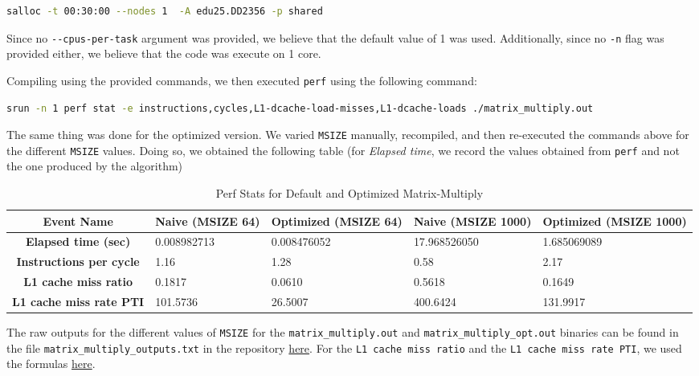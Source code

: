 \documentclass[a4paper,10pt]{article}
\begin{document}
\begin{lstlisting}[language=bash,basicstyle=\ttfamily]
salloc -t 00:30:00 --nodes 1  -A edu25.DD2356 -p shared
\end{lstlisting}
Since no \verb|--cpus-per-task| argument was provided, we believe that the default value of 1 was used. Additionally, since no \verb|-n| flag was provided either, we believe that the code was execute on 1 core. 

Compiling using the provided commands, we then executed \verb|perf| using the following command: 
\begin{lstlisting}[language=bash,basicstyle=\tiny\ttfamily]
srun -n 1 perf stat -e instructions,cycles,L1-dcache-load-misses,L1-dcache-loads ./matrix_multiply.out
\end{lstlisting}
The same thing was done for the optimized version. We varied \verb|MSIZE| manually, recompiled, and then re-executed the commands above for the different \verb|MSIZE| values. 
Doing so, we obtained the following table (for \textit{Elapsed time}, we record the values obtained from \verb|perf| and not the one produced by the algorithm) 
\begin{table}[h!]
\centering
\begin{tabular}{|c|p{2.5cm}|p{2.5cm}|p{2.5cm}|p{2.5cm}|}
\hline
\textbf{Event Name} & \textbf{Naive (MSIZE 64)} & \textbf{Optimized (MSIZE 64)} & \textbf{Naive (MSIZE 1000)} & \textbf{Optimized (MSIZE 1000)} \\
\hline
\textbf{Elapsed time (sec)} & 0.008982713 & 0.008476052 & 17.968526050 & 1.685069089 \\
\hline
\textbf{Instructions per cycle} & 1.16 & 1.28 & 0.58 & 2.17 \\
\hline
\textbf{L1 cache miss ratio} & 0.1817 & 0.0610 & 0.5618 & 0.1649 \\
\hline
\textbf{L1 cache miss rate PTI} & 101.5736 & 26.5007 & 400.6424 & 131.9917  \\
\hline
\end{tabular}
\caption{Perf Stats for Default and Optimized Matrix-Multiply}
\end{table}
The raw outputs for the different values of \verb|MSIZE| for the \verb|matrix_multiply.out| and \verb|matrix_multiply_opt.out| binaries can be found in the file \verb|matrix_multiply_outputs.txt| in the repository \href{https://github.com/paulmyr/DD2356-MethodsHPC/blob/master/2_hpc_arch_perf_model/exercise4/matrix_multiply_outputs.txt}{here}. For the \verb|L1 cache miss ratio| and the \verb|L1 cache miss rate PTI|, we used the formulas \href{https://canvas.kth.se/courses/53216/pages/tutorial-the-perf-tool?module_item_id=1067474}{here}.
\end{document}
